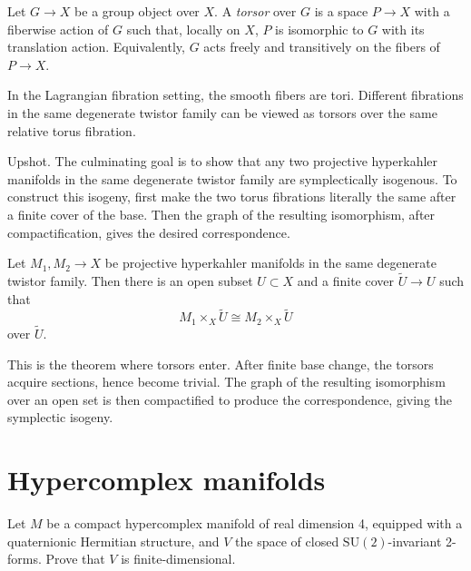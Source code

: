 \documentclass{book}
\begin{document}
\begin{definition}
\label{definition-torsor}
Let $G\to X$ be a group object over $X$.
A {\it torsor} over $G$ is a space
$P\to X$ with a fiberwise action of $G$ such
that, locally on $X$, $P$ is isomorphic to
$G$ with its translation action.
Equivalently, $G$ acts freely and
transitively on the fibers of $P\to X$.
\end{definition}

\noindent
In the Lagrangian fibration setting, the
smooth fibers are tori.
Different fibrations in the same degenerate
twistor family can be viewed as torsors over
the same relative torus fibration.

\medskip
Upshot.
The culminating goal is to show that any two
projective hyperkahler manifolds in the same
degenerate twistor family are symplectically
isogenous.
To construct this isogeny, first make the two
torus fibrations literally the same after a
finite cover of the base.
Then the graph of the resulting isomorphism,
after compactification, gives the desired
correspondence.

\begin{theorem}
\label{theorem-degenerate-twistor-cover}
Let $M_1,M_2\to X$ be projective
hyperkahler manifolds in the same degenerate
twistor family.
Then there is an open subset $U\subset X$
and a finite cover $\widetilde{U}\to U$ such
that
$$
M_1\times_X\widetilde{U}
\cong
M_2\times_X\widetilde{U}
$$
over $\widetilde{U}$.
\end{theorem}

\noindent
This is the theorem where torsors enter.
After finite base change, the torsors acquire
sections, hence become trivial.
The graph of the resulting isomorphism over
an open set is then compactified to produce
the correspondence, giving the symplectic
isogeny.

\section{Hypercomplex manifolds}
\label{section-hypercomplex-manifolds}

\begin{exercise}
\label{exercise-SU2-invariant-forms}
Let $M$ be a compact hypercomplex manifold of
real dimension 4, equipped with a
quaternionic Hermitian structure, and $V$ the
space of closed
$\text{SU}(2)$-invariant 2-forms. Prove that
$V$ is finite-dimensional.
\end{exercise}
\end{document}
